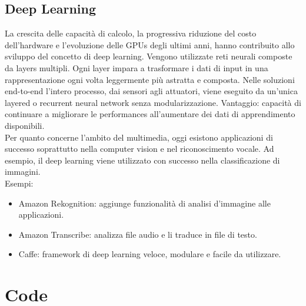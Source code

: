 \documentclass[8pt,a4paper]{article}
\begin{document}
\begin{multicols}{5}
    \subsection{Deep Learning}
    La crescita delle capacità di calcolo, la progressiva riduzione del costo dell’hardware
    e l’evoluzione delle GPUs degli ultimi anni, hanno contribuito allo sviluppo del concetto
    di deep learning. Vengono utilizzate reti neurali composte da layers multipli. Ogni layer
    impara a trasformare i dati di input in una rappresentazione ogni volta leggermente più
    astratta e composta. Nelle soluzioni end-to-end l’intero processo, dai sensori agli attuatori,
    viene eseguito da un’unica layered o recurrent neural network senza modularizzazione.
    Vantaggio: capacità di continuare a migliorare le performances all’aumentare dei dati di
    apprendimento disponibili.\\
    Per quanto concerne l’ambito del multimedia, oggi esistono applicazioni di successo soprattutto
    nella computer vision e nel riconoscimento vocale. Ad esempio, il deep learning viene utilizzato
    con successo nella classificazione di immagini.\\
    Esempi:
    \begin{itemize}
    \item Amazon Rekognition: aggiunge funzionalità di analisi d’immagine alle applicazioni.
    \item Amazon Transcribe: analizza file audio e li traduce in file di testo.
    \item Caffe: framework di deep learning veloce, modulare e facile da utilizzare.
    \end{itemize}

    \section{Code}

\end{multicols}
\end{document}

